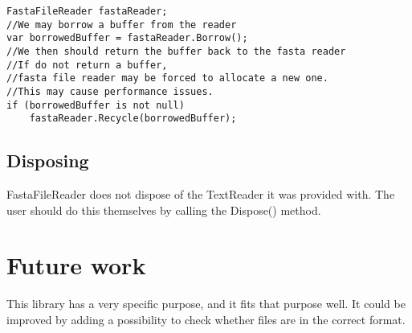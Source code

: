 \begin{lstlisting}
FastaFileReader fastaReader;
//We may borrow a buffer from the reader 
var borrowedBuffer = fastaReader.Borrow();
//We then should return the buffer back to the fasta reader
//If do not return a buffer,
//fasta file reader may be forced to allocate a new one.
//This may cause performance issues.
if (borrowedBuffer is not null) 
    fastaReader.Recycle(borrowedBuffer);
\end{lstlisting}
\subsection{Disposing}
FastaFileReader does not dispose of the TextReader it was provided with. The user should do this themselves by calling the Dispose() method.

\section{Future work}
This library has a very specific purpose, and it fits that purpose well. It could be improved by adding a possibility to check whether files are in the correct format. 
